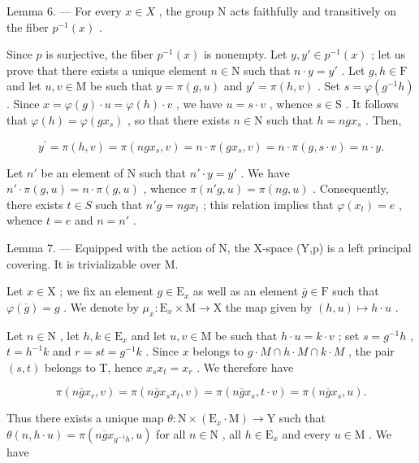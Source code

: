 Lemma 6. --- For every \(x \in X\) , the group N acts faithfully and transitively on the fiber \(p^{-1}(x)\) .

Since \(p\) is surjective, the fiber \(p^{-1}(x)\) is nonempty. Let \(y, y' \in p^{-1}(x)\) ; let us prove that there exists a unique element \(n \in \mathrm{N}\) such that \(n \cdot y = y'\) . Let \(g, h \in \mathrm{F}\) and let \(u, v \in \mathrm{M}\) be such that \(y = \pi(g, u)\) and \(y' = \pi(h, v)\) . Set \(s = \varphi(g^{-1}h)\) . Since \(x = \varphi(g) \cdot u = \varphi(h) \cdot v\) , we have \(u = s \cdot v\) , whence \(s \in \mathrm{S}\) . It follows that \(\varphi(h) = \varphi(gx_s)\) , so that there exists \(n \in \mathrm{N}\) such that \(h = ngx_s\) . Then,

\[
y ^ {\prime} = \pi (h, v) = \pi (n g x _ {s}, v) = n \cdot \pi (g x _ {s}, v) = n \cdot \pi (g, s \cdot v) = n \cdot y.
\]

Let \(n'\) be an element of N such that \(n' \cdot y = y'\) . We have \(n' \cdot \pi(g, u) = n \cdot \pi(g, u)\) , whence \(\pi(n'g, u) = \pi(ng, u)\) . Consequently, there exists \(t \in S\) such that \(n'g = ngx_t\) ; this relation implies that \(\varphi(x_t) = e\) , whence \(t = e\) and \(n = n'\) .

Lemma 7. --- Equipped with the action of N, the X-space (Y,p) is a left principal covering. It is trivializable over M.

Let \(x \in \mathrm{X}\) ; we fix an element \(g \in \mathrm{E}_x\) as well as an element \(\overline{g} \in \mathrm{F}\) such that \(\varphi(\overline{g}) = g\) . We denote by \(\mu_x \colon \mathrm{E}_x \times \mathrm{M} \to \mathrm{X}\) the map given by \((h, u) \mapsto h \cdot u\) .

Let \(n \in \mathrm{N}\) , let \(h, k \in \mathrm{E}_x\) and let \(u, v \in \mathrm{M}\) be such that \(h \cdot u = k \cdot v\) ; set \(s = g^{-1}h\) , \(t = h^{-1}k\) and \(r = st = g^{-1}k\) . Since \(x\) belongs to \(g \cdot M \cap h \cdot M \cap k \cdot M\) , the pair \((s, t)\) belongs to T, hence \(x_s x_t = x_r\) . We therefore have

\[
\pi (n \overline {{g}} x _ {r}, v) = \pi (n \overline {{g}} x _ {s} x _ {t}, v) = \pi (n \overline {{g}} x _ {s}, t \cdot v) = \pi (n \overline {{g}} x _ {s}, u).
\]

Thus there exists a unique map \(\theta\colon\mathrm{N}\times(\mathrm{E}_{x}\cdot\mathrm{M})\to\mathrm{Y}\) such that \(\theta(n,h\cdot u)=\pi(n\overline{g}x_{g^{-1}h},u)\) for all \(n\in\mathrm{N}\) , all \(h\in\mathrm{E}_{x}\) and every \(u\in\mathrm{M}\) . We have

